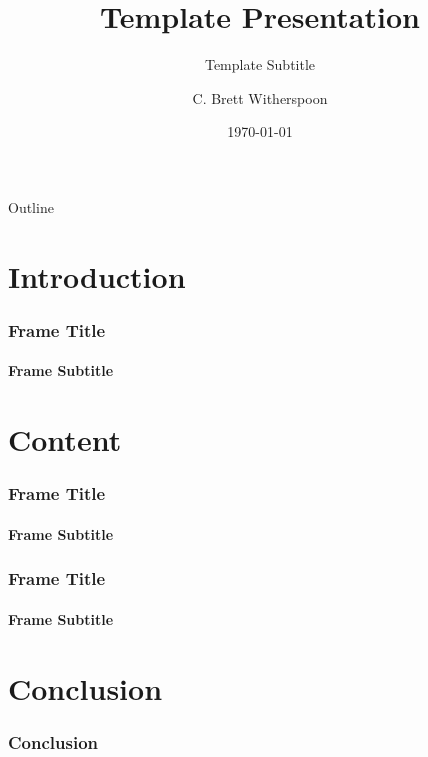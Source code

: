 \documentclass{beamer}
\title{\textcolor{ttuyellow}{Template Presentation}}
\subtitle{Template Subtitle}
\author{C. Brett Witherspoon}
\date{\today}
\institute[\textcolor{ttuyellow}{Tennessee Technological University}]{\texttt{[image: wordmark.png]}}
\begin{document}
{
\begin{frame}
  \titlepage
\end{frame}
}

\begin{frame}{\textcolor{ttuyellow}{Outline}}
    \tableofcontents
\end{frame}

\section{Introduction}

\begin{frame}
    \frametitle{\textcolor{ttuyellow}{Frame Title}}
    \framesubtitle{Frame Subtitle}

\end{frame}

\section{Content}

\begin{frame}
    \frametitle{\textcolor{ttuyellow}{Frame Title}}
    \framesubtitle{Frame Subtitle}

\end{frame}

\begin{frame}
    \frametitle{\textcolor{ttuyellow}{Frame Title}}
    \framesubtitle{Frame Subtitle}

\end{frame}

\section{Conclusion}

\begin{frame}
    \frametitle{\textcolor{ttuyellow}{Conclusion}}

\end{frame}
\end{document}
